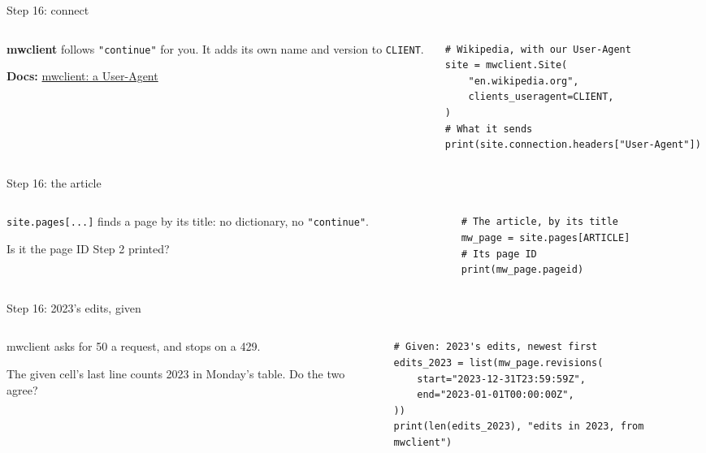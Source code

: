 \documentclass[9pt,aspectratio=169]{beamer}
\begin{document}
\begin{frame}[fragile]{Step 16: connect}
    \begin{columns}[T]
        \begin{column}{0.37\textwidth}
            \textbf{mwclient} follows \texttt{"continue"} for you. It adds its own name and version to \texttt{CLIENT}.

            \medskip
            {\scriptsize\textbf{Docs:} \href{https://mwclient.readthedocs.io/en/stable/user/connecting.html#specifying-a-user-agent}{mwclient: a User-Agent}\par}
        \end{column}
        \begin{column}{0.6\textwidth}
\begin{lstlisting}
# Wikipedia, with our User-Agent
site = mwclient.Site(
    "en.wikipedia.org",
    clients_useragent=CLIENT,
)
# What it sends
print(site.connection.headers["User-Agent"])
\end{lstlisting}
        \end{column}
    \end{columns}
\end{frame}

\begin{frame}[fragile]{Step 16: the article}
    \begin{columns}[T]
        \begin{column}{0.37\textwidth}
            \texttt{site.pages[...]} finds a page by its title: no dictionary, no \texttt{"continue"}.

            \medskip
            Is it the page ID Step 2 printed?
        \end{column}
        \begin{column}{0.6\textwidth}
\begin{lstlisting}
# The article, by its title
mw_page = site.pages[ARTICLE]
# Its page ID
print(mw_page.pageid)
\end{lstlisting}
        \end{column}
    \end{columns}
\end{frame}

\begin{frame}[fragile]{Step 16: 2023's edits, given}
    \begin{columns}[T]
        \begin{column}{0.37\textwidth}
            mwclient asks for 50 a request, and stops on a 429.

            \medskip
            The given cell's last line counts 2023 in Monday's table. Do the two agree?
        \end{column}
        \begin{column}{0.6\textwidth}
\begin{lstlisting}
# Given: 2023's edits, newest first
edits_2023 = list(mw_page.revisions(
    start="2023-12-31T23:59:59Z",
    end="2023-01-01T00:00:00Z",
))
print(len(edits_2023), "edits in 2023, from mwclient")
\end{lstlisting}
        \end{column}
    \end{columns}
\end{frame}
\end{document}
